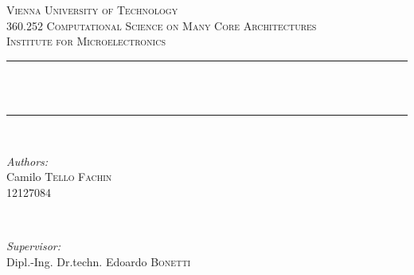 \begin{titlepage}

\newcommand{\HRule}{\rule{\linewidth}{0.5mm}} %

\center %
 

\textsc{\LARGE Vienna University of Technology}\\[1.5cm] %
\textsc{\Large 360.252 Computational Science on Many Core Architectures}\\[0.5cm] %
\textsc{\large Institute for Microelectronics}\\[0.5cm] %


\HRule \\[0.5cm]
{ \huge \bfseries \doctitle}\\[1mm] %
\HRule \\[0.5cm]
 

\begin{minipage}{0.4\textwidth}
\begin{flushleft} \large
\emph{Authors:}\\
Camilo \textsc{Tello Fachin}\\
12127084 \\

\end{flushleft}
\end{minipage}
~
\begin{minipage}{0.4\textwidth}
\begin{flushright} \large
\emph{Supervisor:} \\
Dipl.-Ing. Dr.techn. Edoardo \textsc{Bonetti} \\ %
\end{flushright}
\end{minipage}\\[1.5cm]


\end{titlepage}
